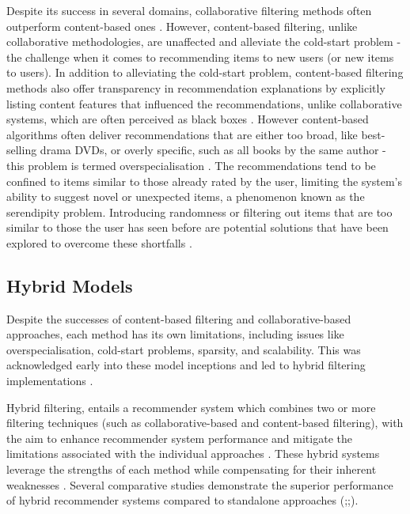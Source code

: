 Despite its success in several domains, collaborative filtering methods often outperform content-based ones \cite{thorat2015survey}. However, content-based filtering, unlike collaborative methodologies, are unaffected and alleviate the cold-start problem \cite{chen2017fully} - the challenge when it comes to recommending items to new users (or new items to users). In addition to alleviating the cold-start problem, content-based filtering methods also offer transparency in recommendation explanations by explicitly listing content features that influenced the recommendations, unlike collaborative systems, which are often perceived as black boxes \cite{lops2011content}. However content-based algorithms often deliver recommendations that are either too broad, like best-selling drama DVDs, or overly specific, such as all books by the same author - this problem is termed overspecialisation \cite{linden2003amazon}. The recommendations tend to be confined to items similar to those already rated by the user, limiting the system's ability to suggest novel or unexpected items, a phenomenon known as the serendipity problem. Introducing randomness or filtering out items that are too similar to those the user has seen before are potential solutions that have been explored to overcome these shortfalls \cite{lops2011content}. 

\subsection{Hybrid Models}
\label{subsec:2 Hybrid Models}

Despite the successes of content-based filtering and collaborative-based approaches, each method has its own limitations, including issues like overspecialisation, cold-start problems, sparsity, and scalability. This was acknowledged early into these model inceptions and led to hybrid filtering implementations \cite{vassiliou2006hybrid}.

Hybrid filtering, entails a recommender system which combines two or more filtering techniques (such as collaborative-based and content-based filtering), with the aim to enhance recommender system performance and mitigate the limitations associated with the individual approaches \cite{sanchez2013improving}. These hybrid systems leverage the strengths of each method while compensating for their inherent weaknesses \cite{zhou2010solving}. Several comparative studies demonstrate the superior performance of hybrid recommender systems compared to standalone approaches (\cite{burke2007hybrid};\cite{vassiliou2006hybrid};\cite{ccano2017hybrid}). 

